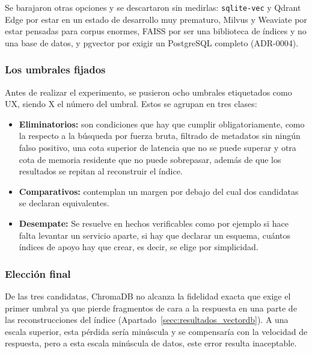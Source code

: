 Se barajaron otras opciones y se descartaron sin medirlas: \texttt{sqlite-vec} y Qdrant Edge por estar en un estado de desarrollo muy prematuro, Milvus y Weaviate por estar pensadas para corpus enormes, FAISS por ser una biblioteca de índices y no una base de datos, y pgvector por exigir un PostgreSQL completo (ADR-0004).


\subsubsection[Los umbrales fijados]{Los umbrales fijados}


Antes de realizar el experimento, se pusieron ocho umbrales etiquetados como UX, siendo X el número del umbral. Estos se agrupan en tres clases:

\begin{itemize}
    \item \textbf{Eliminatorios: } son condiciones que hay que cumplir obligatoriamente, como la  respecto a la búsqueda por fuerza bruta, filtrado de metadatos sin ningún falso positivo, una cota superior de latencia que no se puede superar y otra cota de memoria residente que no puede sobrepasar, además de que los resultados se repitan al reconstruir el índice.
    \item \textbf{Comparativos: } contemplan un margen por debajo del cual dos candidatas se declaran equivalentes.
    \item \textbf{Desempate: } Se resuelve en hechos verificables como por ejemplo si hace falta levantar un servicio aparte, si hay que declarar un esquema, cuántos índices de apoyo hay que crear, es decir, se elige por simplicidad.
\end{itemize}




\subsubsection[Elección final]{Elección final}
\label{secc:eleccion_lancedb}

De las tres candidatas, ChromaDB no alcanza la fidelidad exacta que exige el primer umbral ya que pierde fragmentos de cara a la respuesta en una parte de las reconstrucciones del índice (Apartado~\ref{secc:resultados_vectordb}). A una escala superior, esta pérdida sería minúscula y se compensaría con la velocidad de respuesta, pero a esta escala minúscula de datos, este error resulta inaceptable.

